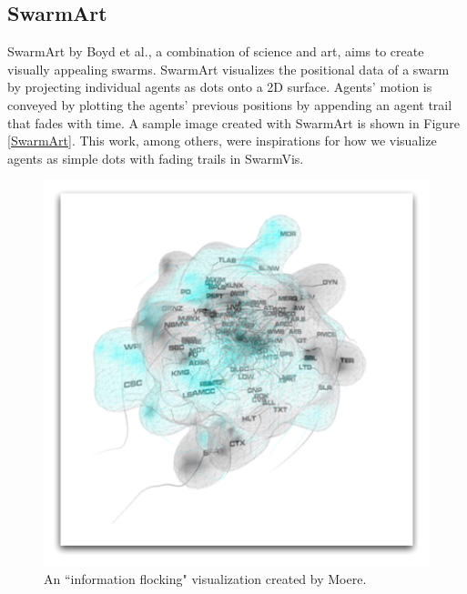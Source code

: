 \documentclass[conference]{IEEEtran}
\begin{document}
\subsection{SwarmArt}
SwarmArt by Boyd et al.\cite{Boyd}, a combination of science and art, aims to create visually appealing swarms.
SwarmArt visualizes the positional data of a swarm by projecting individual agents as dots onto a 2D surface.
Agents' motion is conveyed by plotting the agents' previous positions by
appending an agent trail that fades with time.
A sample image created with SwarmArt is shown in Figure \ref{SwarmArt}.
This work, among others\cite{codeswarm:website}, were inspirations for how we visualize agents as simple dots with fading trails
in SwarmVis.

\begin{figure}
\centering
\includegraphics[scale=.4]{images/blob.pdf}
\caption{An ``information flocking" visualization created by Moere\cite{1382896}.}
\label{Blob}
\end{figure}
\end{document}
